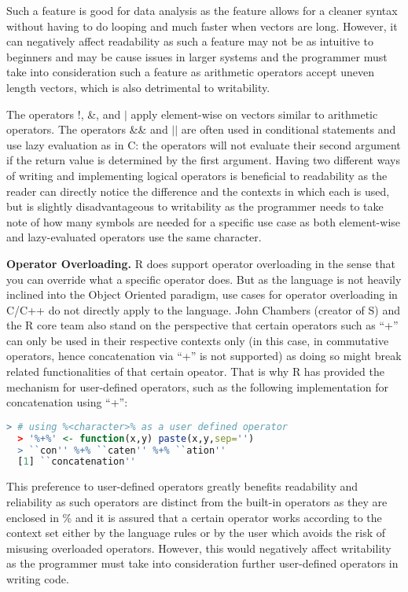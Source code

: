 \documentclass[12pt]{article}
\begin{document}
Such a feature is good for data analysis as the feature allows for a cleaner syntax without having to do looping and much faster when vectors are long. However, it can negatively affect readability as such a feature may not be as intuitive to beginners and may be cause issues in larger systems and the programmer must take into consideration such a feature as arithmetic operators accept uneven length vectors, which is also detrimental to writability.

The operators !, \&, and \(|\) apply element-wise on vectors similar to arithmetic operators. The operators \&\& and \(||\) are often used in conditional statements and use lazy evaluation as in C: the operators will not evaluate their second argument if the return value is determined by the first argument. Having two different ways of writing and implementing logical operators is beneficial to readability as the reader can directly notice the difference and the contexts in which each is used, but is slightly disadvantageous to writability as the programmer needs to take note of how many symbols are needed for a specific use case as both element-wise and lazy-evaluated operators use the same character.

\textbf{Operator Overloading.}
R does support operator overloading in the sense that you can override what a specific operator does. But as the language is not heavily inclined into the Object Oriented paradigm, use cases for operator overloading in C/C++ do not directly apply to the language. John Chambers (creator of S) and the R core team also stand on the perspective that certain operators such as ``+'' can only be used in their respective contexts only (in this case, in commutative operators, hence concatenation via ``+'' is not supported) as doing so might break related functionalities of that certain opeator. That is why R has provided the mechanism for user-defined operators, such as the following implementation for concatenation using ``+'':

\begin{lstlisting}[language=R, frame=none]
  > # using %<character>% as a user defined operator
  > '%+%' <- function(x,y) paste(x,y,sep='')
  > ``con'' %+% ``caten'' %+% ``ation''
  [1] ``concatenation''
\end{lstlisting}

  This preference to user-defined operators greatly benefits readability and reliability as such operators are distinct from the built-in operators as they are enclosed in \% and it is assured that a certain operator works according to the context set either by the language rules or by the user which avoids the risk of misusing overloaded operators. However, this would negatively affect writability as the programmer must take into consideration further user-defined operators in writing code.
\end{document}
